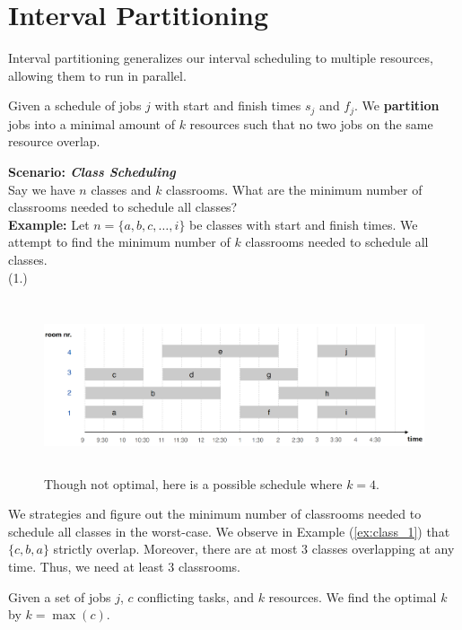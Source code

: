 \newpage
\section{Interval Partitioning}
Interval partitioning generalizes our interval scheduling to multiple resources, allowing them to run in parallel.

\begin{Def}
    
    Given a schedule of jobs $j$ with start and finish times $s_j$ and $f_j$. We \textbf{partition}
    jobs into a minimal amount of $k$ resources such that no two jobs on the same resource overlap.
\end{Def}
\textbf{Scenario: \textit{Class Scheduling}}\\
\noindent
Say we have $n$ classes and $k$ classrooms. What are the minimum number of classrooms needed to schedule all classes?\\


\noindent
\textbf{Example:} Let $n=\{a,b,c,\dots,i\}$ be classes with start and finish times. We attempt to find the minimum number of $k$ classrooms needed to schedule all classes.\\

\noindent
(1.)\label{ex:class_1}
\begin{figure}[h]
    \begin{center}
      \includegraphics[height=2in]{./Sections/sched/interval/part/class_4.png}
    \end{center}
     \caption{Though not optimal, here is a possible schedule where $k=4$.}\label{fig:class_4}
\end{figure}

\noindent
We strategies and figure out the minimum number of classrooms needed to schedule all classes in the worst-case.
We observe in Example (\ref{ex:class_1}) that $\{c,b,a\}$ strictly overlap. Moreover, there are at most $3$ classes overlapping at any time. Thus, we need at least $3$ classrooms.\\
\begin{theo}
    
    Given a set of jobs $j$, $c$ conflicting tasks, and $k$ resources. We find the 
    optimal $k$ by $k = \max(c)$.
\end{theo}

